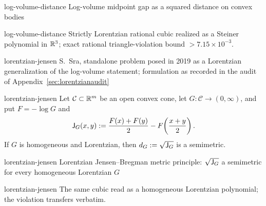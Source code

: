 \begin{cxsummary}{log-volume-distance}
Log-volume midpoint gap as a squared distance on convex bodies \cite{Shephard}
\end{cxsummary}

\begin{cxcertificate}{log-volume-distance}
Strictly Lorentzian rational cubic realized as a Steiner polynomial in $\mathbb R^3$; exact rational triangle-violation bound $>7.15\times10^{-3}$.
\end{cxcertificate}


\begin{cxsource}{lorentzian-jensen}
S.~Sra, standalone problem posed in 2019 as a Lorentzian generalization of the log-volume statement; formulation as recorded in the audit of Appendix~\ref{sec:lorentzianaudit}
\end{cxsource}

\begin{cxstatement}{lorentzian-jensen}
Let $\mathcal C\subset\mathbb R^m$ be an open convex cone, let $G:\mathcal C\to(0,\infty)$, and put $F=-\log G$ and
\[\mathsf{J}_G(x,y):=\frac{F(x)+F(y)}2-F\!\left(\frac{x+y}{2}\right).\]
If $G$ is homogeneous and Lorentzian, then $d_G:=\sqrt{\mathsf{J}_G}$ is a semimetric.
\end{cxstatement}

\begin{cxsummary}{lorentzian-jensen}
Lorentzian Jensen--Bregman metric principle: $\sqrt{\mathsf{J}_G}$ a semimetric for every homogeneous Lorentzian $G$
\end{cxsummary}

\begin{cxcertificate}{lorentzian-jensen}
The same cubic read as a homogeneous Lorentzian polynomial; the violation transfers verbatim.
\end{cxcertificate}

